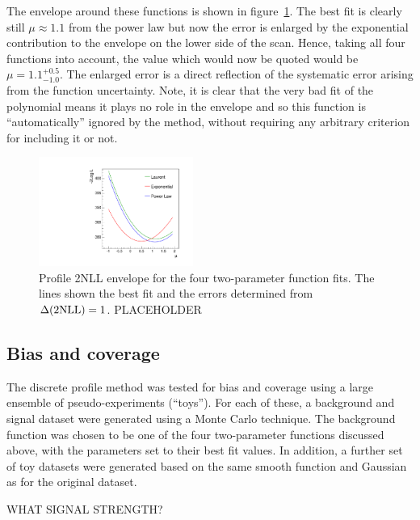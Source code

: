 The envelope around these functions is shown in
figure~\ref{fig:functions:envelope}.
The best fit is clearly still $\mu \approx 1.1$ from the power law
but now the error is enlarged by the exponential contribution to the
envelope on the lower side of the scan. Hence, taking all four functions into
account, the value which would now be quoted would be 
$\mu = 1.1^{+0.5}_{-1.0}$. The enlarged error is a direct reflection of the
systematic error arising from the function uncertainty. Note,
it is clear that the very bad fit of the polynomial
means it plays no role in the envelope and so this function is 
``automatically'' ignored by the method,
without requiring any arbitrary criterion for
including it or not.
%
\begin{figure}[tbp]
\centering
\includegraphics[width=0.45\textwidth]{functions/Profiles.pdf}
\caption{Profile 2NLL envelope for the four two-parameter function fits.
The lines shown the best fit and the errors determined from
$\Delta({\rm 2NLL})=1$.
PLACEHOLDER}
\label{fig:functions:envelope}
\end{figure}


\subsection{Bias and coverage}
\label{sec:functions:coverage}

The discrete profile method was tested for bias and coverage 
using a large ensemble of
pseudo-experiments (``toys''). For each of these, a background and signal 
dataset were generated using a Monte Carlo technique. The background function
was chosen to be one of the four two-parameter functions discussed above, with
the parameters set to their best fit values. In addition, a further set of
toy datasets were generated based on the same
smooth function and Gaussian as for the original dataset.

WHAT SIGNAL STRENGTH?

